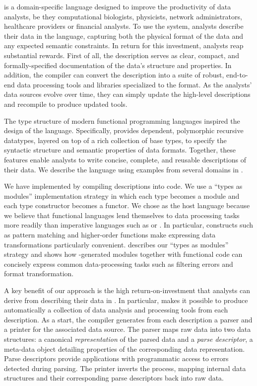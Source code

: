 \padsml{} is a domain-specific language designed to 
improve the productivity of data analysts, be they computational biologists, physicists, network administrators, healthcare providers or financial analysts.
To use the system, analysts describe their data in the \padsml{} language, capturing both the physical format of the data and any expected semantic constraints.  In return for this investment, analysts reap substantial rewards.
First of all, the description
serves as clear, compact, and formally-specified documentation of 
the data's structure and properties.  In addition, the \padsml{}
compiler can convert the description into a suite of robust, end-to-end
data processing tools and libraries specialized
to the format.  As the analysts' data sources evolve over time,
they can simply update the high-level descriptions
and recompile to produce updated tools.


The type structure of modern functional programming languages inspired the design of the \padsml{} language.  
Specifically, \padsml{} provides dependent, polymorphic recursive datatypes, layered on top of a rich collection of base types, to specify the syntactic structure and semantic properties of data
formats.  Together, these features enable analysts to write concise,
complete, and reusable descriptions of their data.  
We describe the \padsml{} language using examples from several domains
in .

We have implemented \padsml{} by compiling descriptions into
\ocaml{} code.  We use a
``types as modules'' implementation strategy in which each \padsml{} type
becomes a module and each \padsml{} type constructor becomes a functor. 
We chose \ml{} as the host language because we believe that 
functional languages lend themselves to data processing tasks more readily than imperative languages such as \C{} or \java{}.  In particular, constructs such as pattern matching and higher-order functions make expressing data transformations particularly convenient.  describes our ``types as modules''
strategy and shows how \padsml{}-generated modules together
with functional \ocaml{} code can concisely express
common
data-processing tasks such as filtering errors and format transformation.

A key benefit of our approach is the high return-on-investment that
analysts can derive from describing their data in \padsml{}.  In particular, \padsml{} makes it possible to produce automatically a collection of data analysis and processing tools from each description.   
As a start, the \padsml{} compiler generates from each description a parser and a printer for the associated data source.  The parser maps raw 
data into two data
structures: a canonical \textit{representation} of the parsed data and
a \textit{parse descriptor}, a meta-data object detailing properties
of the corresponding data representation.  Parse descriptors provide
applications with programmatic access to errors detected during
parsing.  The printer inverts the process, mapping internal data structures
and their corresponding parse descriptors back into raw data.

